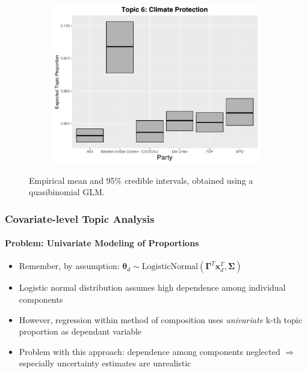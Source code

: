 \documentclass[xcolor=dvipsnames]{beamer}
\begin{document}
\begin{frame}
\begin{figure}[h!]
\begin{subfigure}[b]{0.4\linewidth}
    \includegraphics[width=\linewidth]{../../plots/presentation/quasi_t6_cat.pdf}
  \end{subfigure}
  \caption{Empirical mean and 95\% credible intervals, obtained using a quasibinomial GLM.}
  \label{fig:quasi_t46_cont}
\end{figure}
\end{frame}

\begin{frame}
\frametitle{Covariate-level Topic Analysis}
\framesubtitle{Problem: Univariate Modeling of Proportions}
\begin{itemize}
\item Remember, by assumption: $\boldsymbol{\theta}_d \sim \text{LogisticNormal}(\boldsymbol{\Gamma}^T\boldsymbol{x}_d^T, \boldsymbol{\Sigma})$
\item Logistic normal distribution assumes high dependence among individual components
\item However, regression within method of composition uses \textit{univariate} k-th topic proportion as dependant variable 
\item Problem with this approach: dependence among components neglected $\Rightarrow$ especially uncertainty estimates are unrealistic
\end{itemize}
\end{frame}
\end{document}
